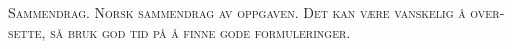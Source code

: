 \begin{otherlanguage}{norsk}

\noindent \scshape\mdseries Sammendrag. \normalfont
Norsk sammendrag av oppgaven. Det kan være vanskelig å oversette, så bruk god tid på å finne gode formuleringer.
\end{otherlanguage}

\cleardoublepage